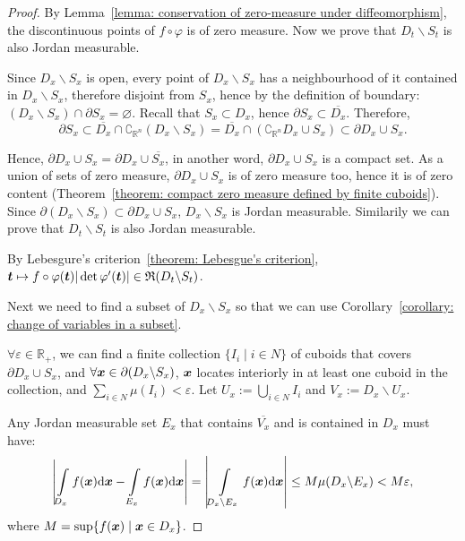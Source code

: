 \documentclass[openany]{book}
\begin{document}
\begin{proof}
	By Lemma~\ref{lemma: conservation of zero-measure under diffeomorphism}, the discontinuous points of $f \circ \varphi$ is of zero measure. 
	Now we prove that $D_t \backslash S_t$ is also Jordan measurable.

	Since $D_x \backslash S_x$ is open, every point of $D_x \backslash S_x$ has a neighbourhood of it contained in $D_x \backslash S_x$, therefore disjoint from $S_x$, hence by the definition of boundary: $(D_x \backslash S_x) \cap \partial S_x = \varnothing$. 
	Recall that $S_x \subset D_x$, hence $\partial S_x \subset \overline{D_x}$. 
	Therefore, 
	\begin{equation*}
		\partial S_x 
		\subset \overline{D_x} \cap \complement_{\mathbb R^n} (D_x \backslash S_x) 
		= \overline{D_x} \cap (\complement_{\mathbb R^n} D_x \cup S_x)
		\subset \partial D_x \cup S_x.
	\end{equation*}

	Hence, $\partial D_x \cup S_x = \partial D_x \cup \overline{S_x}$, in another word, $\partial D_x \cup S_x$ is a compact set. 
	As a union of sets of zero measure, $\partial D_x \cup S_x$ is of zero measure too, hence it is of zero content (Theorem~\ref{theorem: compact zero measure defined by finite cuboids}). 
	Since $\partial (D_x \backslash S_x) \subset \partial D_x \cup S_x$, $D_x \backslash S_x$ is Jordan measurable. 
	Similarily we can prove that $D_t \backslash S_t$ is also Jordan measurable.

	By Lebesgure's criterion~\ref{theorem: Lebesgue's criterion}, $\boldsymbol{t} \mapsto f \circ \varphi(\boldsymbol{t}) |\det \varphi'(\boldsymbol{t})| \in \mathfrak R(D_t \backslash S_t)$. 
	
	Next we need to find a subset of $D_x \backslash S_x$ so that we can use Corollary~\ref{corollary: change of variables in a subset}.

	$\forall \varepsilon \in \mathbb R_+$, we can find a finite collection $\{I_i \mid i \in N\}$ of cuboids that covers $\partial D_x \cup S_x$, and $\forall \boldsymbol{x} \in \partial (D_x \backslash S_x)$, $\boldsymbol{x}$ locates interiorly in at least one cuboid in the collection, and $\sum_{i \in N} \mu(I_i) < \varepsilon$. 
	Let $U_x := \bigcup_{i \in N} I_i$ and $V_x := D_x \backslash U_x$.

	Any Jordan measurable set $E_x$ that contains $\overline{V_x}$ and is contained in $D_x$ must have:
	\begin{equation*}
		\left|
			\int\limits_{D_x} f(\boldsymbol{x}) \mathrm{d} \boldsymbol{x} - \int\limits_{E_x} f(\boldsymbol{x}) \mathrm{d} \boldsymbol{x}
		\right|
		 = \left|
		 \int\limits_{D_x \backslash E_x} f(\boldsymbol{x}) \mathrm{d} \boldsymbol{x}
	 \right| \leq M \mu(D_x \backslash E_x) < M \varepsilon,
	\end{equation*}
	where $M = \sup \{f(\boldsymbol{x}) \mid \boldsymbol{x} \in D_x\}$.


\end{proof}
\end{document}
